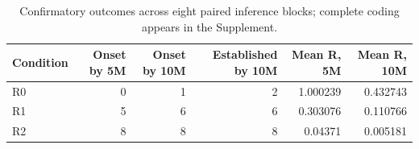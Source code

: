 \begin{table}[!htbp]
\centering
\caption{Confirmatory outcomes across eight paired inference blocks; complete coding appears in the Supplement.}
\label{tab:table03-v36-confirmatory-outcomes-main}
\small
\setlength{\tabcolsep}{4pt}
\begin{tabular}{lrrrrr}
\toprule
Condition & Onset by 5M & Onset by 10M & Established by 10M & Mean R, 5M & Mean R, 10M \\
\midrule
R0 & 0 & 1 & 2 & 1.000239 & 0.432743 \\
R1 & 5 & 6 & 6 & 0.303076 & 0.110766 \\
R2 & 8 & 8 & 8 & 0.04371 & 0.005181 \\
\bottomrule
\end{tabular}
\end{table}
